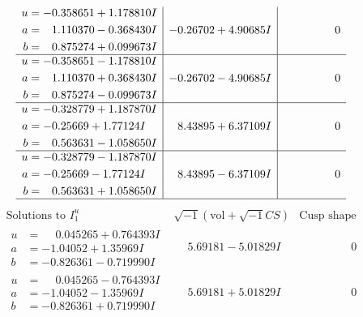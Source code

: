 \documentclass[1p]{elsarticle_modified}
\theoremstyle{definition}
\newcommand{\I}{\sqrt{-1}}
\begin{document}
$$\begin{array}{c|c|c}
\begin{aligned}
u &= -0.358651 + 1.178810 I \\
a &= \phantom{-}1.110370 - 0.368430 I \\
b &= \phantom{-}0.875274 + 0.099673 I\end{aligned}
 & -0.26702 + 4.90685 I & \phantom{-0.000000 } 0 \\ \hline\begin{aligned}
u &= -0.358651 - 1.178810 I \\
a &= \phantom{-}1.110370 + 0.368430 I \\
b &= \phantom{-}0.875274 - 0.099673 I\end{aligned}
 & -0.26702 - 4.90685 I & \phantom{-0.000000 } 0 \\ \hline\begin{aligned}
u &= -0.328779 + 1.187870 I \\
a &= -0.25669 + 1.77124 I \\
b &= \phantom{-}0.563631 - 1.058650 I\end{aligned}
 & \phantom{-}8.43895 + 6.37109 I & \phantom{-0.000000 } 0 \\ \hline\begin{aligned}
u &= -0.328779 - 1.187870 I \\
a &= -0.25669 - 1.77124 I \\
b &= \phantom{-}0.563631 + 1.058650 I\end{aligned}
 & \phantom{-}8.43895 - 6.37109 I & \phantom{-0.000000 } 0\\
 \hline 
 \end{array}$$\newpage$$\begin{array}{c|c|c}  
\text{Solutions to }I^u_{1}& \I (\text{vol} + \sqrt{-1}CS) & \text{Cusp shape}\\
 \hline 
\begin{aligned}
u &= \phantom{-}0.045265 + 0.764393 I \\
a &= -1.04052 + 1.35969 I \\
b &= -0.826361 - 0.719990 I\end{aligned}
 & \phantom{-}5.69181 - 5.01829 I & \phantom{-0.000000 } 0 \\ \hline\begin{aligned}
u &= \phantom{-}0.045265 - 0.764393 I \\
a &= -1.04052 - 1.35969 I \\
b &= -0.826361 + 0.719990 I\end{aligned}
 & \phantom{-}5.69181 + 5.01829 I & \phantom{-0.000000 } 0 \\ \hline\begin{aligned}

\end{aligned}
\end{array}$$
\end{document}
